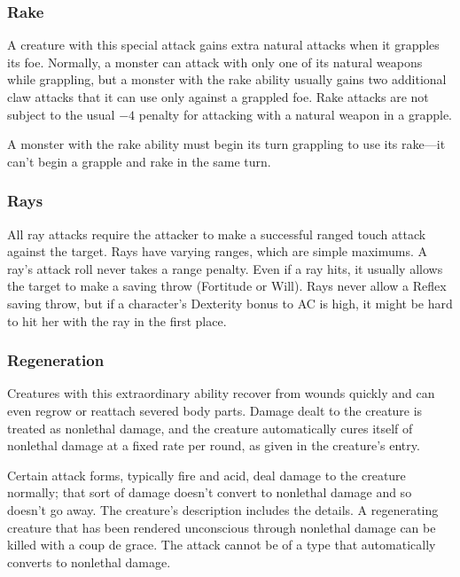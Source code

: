 
\subsubsection{Rake}
A creature with this special attack gains extra natural attacks when it grapples its foe. Normally, a monster can attack with only one of its natural weapons while grappling, but a monster with the rake ability usually gains two additional claw attacks that it can use only against a grappled foe. Rake attacks are not subject to the usual $-4$ penalty for attacking with a natural weapon in a grapple.

A monster with the rake ability must begin its turn grappling to use its rake---it can't begin a grapple and rake in the same turn.

\subsubsection{Rays}
All ray attacks require the attacker to make a successful ranged touch attack against the target. Rays have varying ranges, which are simple maximums. A ray's attack roll never takes a range penalty. Even if a ray hits, it usually allows the target to make a saving throw (Fortitude or Will). Rays never allow a Reflex saving throw, but if a character's Dexterity bonus to AC is high, it might be hard to hit her with the ray in the first place.

\subsubsection{Regeneration}
Creatures with this extraordinary ability recover from wounds quickly and can even regrow or reattach severed body parts. Damage dealt to the creature is treated as nonlethal damage, and the creature automatically cures itself of nonlethal damage at a fixed rate per round, as given in the creature's entry.

Certain attack forms, typically fire and acid, deal damage to the creature normally; that sort of damage doesn't convert to nonlethal damage and so doesn't go away. The creature's description includes the details. A regenerating creature that has been rendered unconscious through nonlethal damage can be killed with a coup de grace. The attack cannot be of a type that automatically converts to nonlethal damage.

